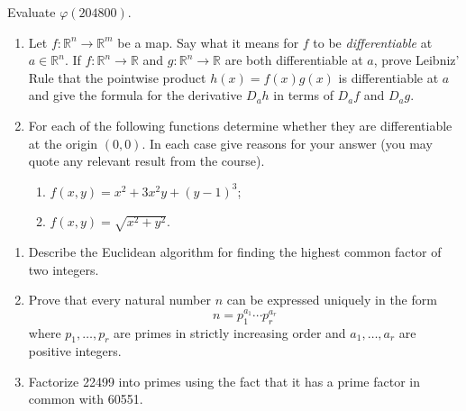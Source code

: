 \documentclass{exams}
\newcommand{\R}{\mathbb{R}}
\begin{document}
\begin{exam}
\begin{question}
Evaluate $\varphi(204800)$.
\end{question}

\begin{question}
\begin{enumerate}
\item Let $f \colon \R^n \to \R^m$ be a map. Say what it means for $f$ to be
\textit{differentiable} at $a \in \R^n$. If $f \colon \R^n \to \R$ and
$g \colon \R^n \to \R$ are both differentiable at $a$, prove Leibniz'
Rule that the pointwise product $h(x) = f(x)g(x)$ is differentiable at
$a$ and give the formula for the derivative $D_ah$ in terms of $D_af$
and $D_ag$.

\item For each of the following functions determine whether they are
differentiable at the origin $(0,0)$. In each case give reasons for your
answer (you may quote any relevant result from the course).

\begin{enumerate}
\item $f(x,y) = x^2 + 3x^2y + (y-1)^3$;
\item $f(x,y) = \sqrt{x^2+y^2}$.
\end{enumerate}
\end{enumerate}
\end{question}




\begin{question}
\begin{enumerate}
\item Describe the Euclidean algorithm for finding the
highest common factor of two integers.
\item Prove that every natural number $n$ can be expressed
uniquely in the form
$$
n=p_1^{a_1}\cdots p_r^{a_r}
$$
where $p_1,\ldots,p_r$ are primes in strictly increasing order
and $a_1,\ldots,a_r$ are positive integers.
\item Factorize 22499 into primes using the fact that it has a
prime factor in common with 60551.
\end{enumerate}
\end{question}


\end{exam}
\end{document}
